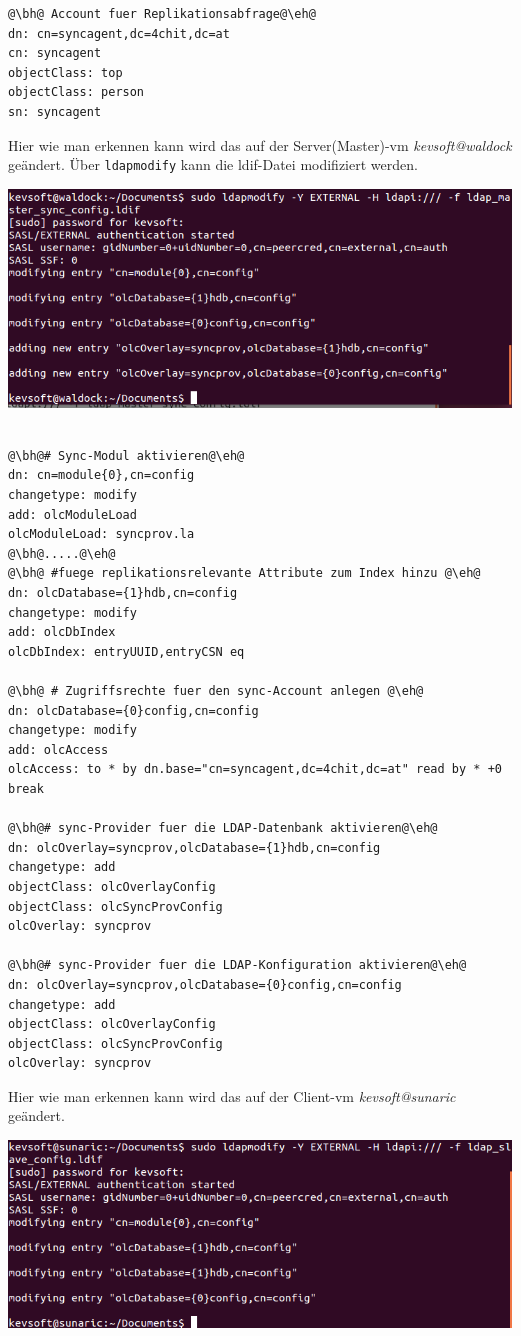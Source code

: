 \begin{lstlisting}[escapechar=@]
@\bh@ Account fuer Replikationsabfrage@\eh@
dn: cn=syncagent,dc=4chit,dc=at
cn: syncagent
objectClass: top
objectClass: person
sn: syncagent
\end{lstlisting}
Hier wie man erkennen kann wird das auf der Server(Master)-vm \textit{kevsoft@waldock } geändert.
Über \verb|ldapmodify| kann die ldif-Datei modifiziert werden.
\begin{center}
	\includegraphics[width=1.0\linewidth]{images/a8_config_master_sync.PNG}
\end{center}

\begin{lstlisting}[escapechar=@]
      
@\bh@# Sync-Modul aktivieren@\eh@
dn: cn=module{0},cn=config
changetype: modify
add: olcModuleLoad
olcModuleLoad: syncprov.la
@\bh@.....@\eh@
@\bh@ #fuege replikationsrelevante Attribute zum Index hinzu @\eh@
dn: olcDatabase={1}hdb,cn=config
changetype: modify
add: olcDbIndex
olcDbIndex: entryUUID,entryCSN eq

@\bh@ # Zugriffsrechte fuer den sync-Account anlegen @\eh@
dn: olcDatabase={0}config,cn=config
changetype: modify
add: olcAccess
olcAccess: to * by dn.base="cn=syncagent,dc=4chit,dc=at" read by * +0 break

@\bh@# sync-Provider fuer die LDAP-Datenbank aktivieren@\eh@
dn: olcOverlay=syncprov,olcDatabase={1}hdb,cn=config
changetype: add
objectClass: olcOverlayConfig
objectClass: olcSyncProvConfig
olcOverlay: syncprov

@\bh@# sync-Provider fuer die LDAP-Konfiguration aktivieren@\eh@
dn: olcOverlay=syncprov,olcDatabase={0}config,cn=config
changetype: add
objectClass: olcOverlayConfig
objectClass: olcSyncProvConfig
olcOverlay: syncprov
\end{lstlisting}

Hier wie man erkennen kann wird das auf der Client-vm \textit{kevsoft@sunaric } geändert.
\begin{center}
	\includegraphics[width=1.0\linewidth]{images/a9_config_slave_sync.PNG}
\end{center}

